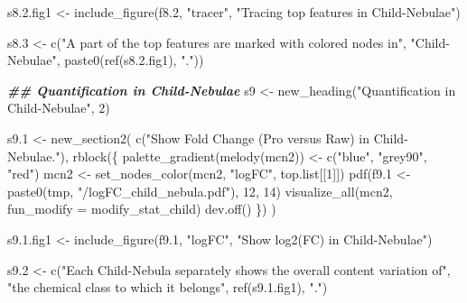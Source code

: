 \documentclass[
]{article}
\newenvironment{Shaded}{\begin{snugshade}}{\end{snugshade}}
\newcommand{\AttributeTok}[1]{\textcolor[rgb]{0.77,0.63,0.00}{#1}}
\newcommand{\DecValTok}[1]{\textcolor[rgb]{0.00,0.00,0.81}{#1}}
\newcommand{\DocumentationTok}[1]{\textcolor[rgb]{0.56,0.35,0.01}{\textbf{\textit{#1}}}}
\newcommand{\FloatTok}[1]{\textcolor[rgb]{0.00,0.00,0.81}{#1}}
\newcommand{\FunctionTok}[1]{\textcolor[rgb]{0.00,0.00,0.00}{#1}}
\newcommand{\NormalTok}[1]{#1}
\newcommand{\OtherTok}[1]{\textcolor[rgb]{0.56,0.35,0.01}{#1}}
\newcommand{\StringTok}[1]{\textcolor[rgb]{0.31,0.60,0.02}{#1}}
\begin{document}
\begin{Shaded}
\begin{Highlighting}[]
\NormalTok{s8.}\FloatTok{2.}\NormalTok{fig1 }\OtherTok{\textless{}{-}} \FunctionTok{include\_figure}\NormalTok{(f8}\FloatTok{.2}\NormalTok{, }\StringTok{"tracer"}\NormalTok{, }\StringTok{"Tracing top features in Child{-}Nebulae"}\NormalTok{)}

\NormalTok{s8}\FloatTok{.3} \OtherTok{\textless{}{-}} \FunctionTok{c}\NormalTok{(}\StringTok{"A part of the top features are marked with colored nodes in"}\NormalTok{,}
          \StringTok{"Child{-}Nebulae"}\NormalTok{, }\FunctionTok{paste0}\NormalTok{(}\FunctionTok{ref}\NormalTok{(s8.}\FloatTok{2.}\NormalTok{fig1), }\StringTok{"."}\NormalTok{))}

\DocumentationTok{\#\# Quantification in Child{-}Nebulae}
\NormalTok{s9 }\OtherTok{\textless{}{-}} \FunctionTok{new\_heading}\NormalTok{(}\StringTok{"Quantification in Child{-}Nebulae"}\NormalTok{, }\DecValTok{2}\NormalTok{)}

\NormalTok{s9}\FloatTok{.1} \OtherTok{\textless{}{-}} \FunctionTok{new\_section2}\NormalTok{(}
  \FunctionTok{c}\NormalTok{(}\StringTok{"Show Fold Change (Pro versus Raw) in Child{-}Nebulae."}\NormalTok{),}
  \FunctionTok{rblock}\NormalTok{(\{}
    \FunctionTok{palette\_gradient}\NormalTok{(}\FunctionTok{melody}\NormalTok{(mcn2)) }\OtherTok{\textless{}{-}} \FunctionTok{c}\NormalTok{(}\StringTok{"blue"}\NormalTok{, }\StringTok{"grey90"}\NormalTok{, }\StringTok{"red"}\NormalTok{)}
\NormalTok{    mcn2 }\OtherTok{\textless{}{-}} \FunctionTok{set\_nodes\_color}\NormalTok{(mcn2, }\StringTok{"logFC"}\NormalTok{, top.list[[}\DecValTok{1}\NormalTok{]])}
    \FunctionTok{pdf}\NormalTok{(f9}\FloatTok{.1} \OtherTok{\textless{}{-}} \FunctionTok{paste0}\NormalTok{(tmp, }\StringTok{"/logFC\_child\_nebula.pdf"}\NormalTok{), }\DecValTok{12}\NormalTok{, }\DecValTok{14}\NormalTok{)}
    \FunctionTok{visualize\_all}\NormalTok{(mcn2, }\AttributeTok{fun\_modify =}\NormalTok{ modify\_stat\_child)}
    \FunctionTok{dev.off}\NormalTok{()}
\NormalTok{  \})}
\NormalTok{)}

\NormalTok{s9.}\FloatTok{1.}\NormalTok{fig1 }\OtherTok{\textless{}{-}} \FunctionTok{include\_figure}\NormalTok{(f9}\FloatTok{.1}\NormalTok{, }\StringTok{"logFC"}\NormalTok{, }\StringTok{"Show log2(FC) in Child{-}Nebulae"}\NormalTok{)}

\NormalTok{s9}\FloatTok{.2} \OtherTok{\textless{}{-}} \FunctionTok{c}\NormalTok{(}\StringTok{"Each Child{-}Nebula separately shows the overall content variation of"}\NormalTok{,}
          \StringTok{"the chemical class to which it belongs"}\NormalTok{, }\FunctionTok{ref}\NormalTok{(s9.}\FloatTok{1.}\NormalTok{fig1), }\StringTok{"."}\NormalTok{)}


\end{Highlighting}
\end{Shaded}
\end{document}
